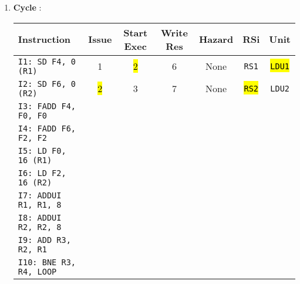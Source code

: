 \begin{enumerate}
    \item \textbf{Cycle \theenumi}:
    
    \begin{table}[!htp]
        \centering
        \begin{adjustbox}{width={\textwidth},totalheight={\textheight},keepaspectratio}
        \begin{tabular}{@{} l c c c c c c @{}}
            \toprule
            \textbf{Instruction} & \textbf{Issue} & \textbf{Start Exec} & \textbf{Write Res} & \textbf{Hazard} & \textbf{RSi} & \textbf{Unit} \\
            \midrule
            \texttt{I1: SD F4, 0 (R1)}      & 1 & \hl{2} & 6 & None  & \texttt{RS1}   & \hl{\texttt{LDU1}}  \\ [.5em]
            \texttt{I2: SD F6, 0 (R2)}      & \hl{2} & 3 & 7 & None  & \hl{\texttt{RS2}}   & \texttt{LDU2}  \\ [.5em]
            \texttt{I3: FADD F4, F0, F0}    &   &   &   &       &       &       \\ [.5em]
            \texttt{I4: FADD F6, F2, F2}    &   &   &   &       &       &       \\ [.5em]
            \texttt{I5: LD F0, 16 (R1)}     &   &   &   &       &       &       \\ [.5em]
            \texttt{I6: LD F2, 16 (R2)}     &   &   &   &       &       &       \\ [.5em]
            \texttt{I7: ADDUI R1, R1, 8}    &   &   &   &       &       &       \\ [.5em]
            \texttt{I8: ADDUI R2, R2, 8}    &   &   &   &       &       &       \\ [.5em]
            \texttt{I9: ADD R3, R2, R1}     &   &   &   &       &       &       \\ [.5em]
            \texttt{I10: BNE R3, R4, LOOP}   &   &   &   &       &       &       \\
            \bottomrule
        \end{tabular}
        \end{adjustbox}
    \end{table}
    

\end{enumerate}
